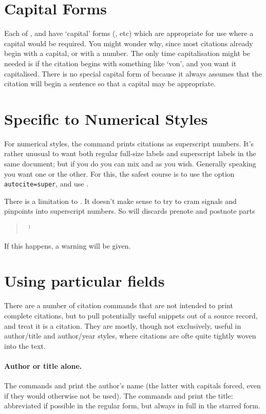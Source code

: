 \section{Capital Forms}

Each of ,  and  have `capital'
forms (, etc) which are appropriate for use where a capital
would be required. You might wonder why, since most citations already
begin with a capital, or with a number. The only time capitalisation
might be needed is if the citation begins with something like `von',
and you want it capitalised. There is no special capital form of
 because it always assumes that the citation will begin a
sentence so that a capital may be appropriate.

\section{Specific to Numerical Styles}

For numerical styles, the command  prints citations as
superscript numbers. It’s rather unusual to want both regular
full-size labels and superscript labels in the same document; but if
you do you can mix  and  as you wish. Generally
speaking you want one or the other. For this, the safest course is to
use the option \texttt{autocite=super}, and use .

There is a limitation to . It doesn't make sense to try
to cram signals and pinpoints into superscript numbers. So
 will discards prenote and postnote parts
\begin{quote}
 \gives\ $^1$
\end{quote}
If this happens, a warning will be given.

\section{Using particular fields}

There are a number of citation commands that are not intended to print
complete citations, but to pull potentially useful snippets out of a
source record, and treat it is a citation. They are mostly, though not
exclusively, useful in author/title and author/year styles, where
citations are ofte quite tightly woven into the text.

\paragraph{Author or title alone.} The commands  and
 print the author's name (the latter with capitals
forced, even if they would otherwise not be used). The commands
 and  print the title: abbreviated if
possible in the regular form, but always in full in the starred form.

